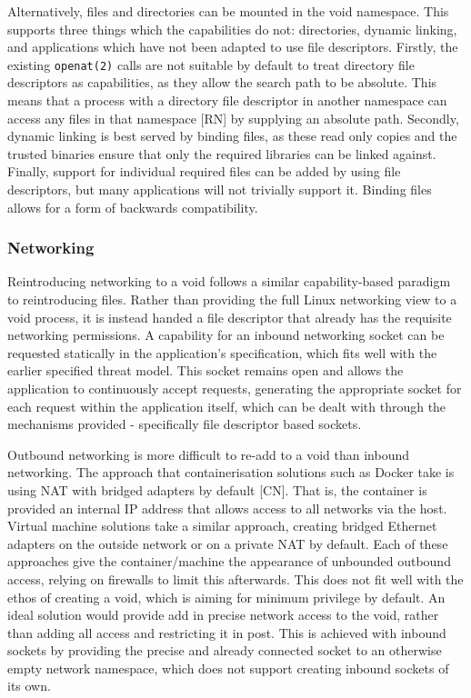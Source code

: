 \documentclass[sigplan]{acmart}
\begin{document}
Alternatively, files and directories can be mounted in the void namespace. This supports three things which the capabilities do not: directories, dynamic linking, and applications which have not been adapted to use file descriptors. Firstly, the existing \texttt{openat(2)} calls are not suitable by default to treat directory file descriptors as capabilities, as they allow the search path to be absolute. This means that a process with a directory file descriptor in another namespace can access any files in that namespace [RN] by supplying an absolute path. Secondly, dynamic linking is best served by binding files, as these read only copies and the trusted binaries ensure that only the required libraries can be linked against. Finally, support for individual required files can be added by using file descriptors, but many applications will not trivially support it. Binding files allows for a form of backwards compatibility.

\subsubsection{Networking}

Reintroducing networking to a void follows a similar capability-based paradigm to reintroducing files. Rather than providing the full Linux networking view to a void process, it is instead handed a file descriptor that already has the requisite networking permissions. A capability for an inbound networking socket can be requested statically in the application's specification, which fits well with the earlier specified threat model. This socket remains open and allows the application to continuously accept requests, generating the appropriate socket for each request within the application itself, which can be dealt with through the mechanisms provided - specifically file descriptor based sockets.

Outbound networking is more difficult to re-add to a void than inbound networking. The approach that containerisation solutions such as Docker take is using NAT with bridged adapters by default [CN]. That is, the container is provided an internal IP address that allows access to all networks via the host. Virtual machine solutions take a similar approach, creating bridged Ethernet adapters on the outside network or on a private NAT by default. Each of these approaches give the container/machine the appearance of unbounded outbound access, relying on firewalls to limit this afterwards. This does not fit well with the ethos of creating a void, which is aiming for minimum privilege by default. An ideal solution would provide add in precise network access to the void, rather than adding all access and restricting it in post. This is achieved with inbound sockets by providing the precise and already connected socket to an otherwise empty network namespace, which does not support creating inbound sockets of its own.
\end{document}
